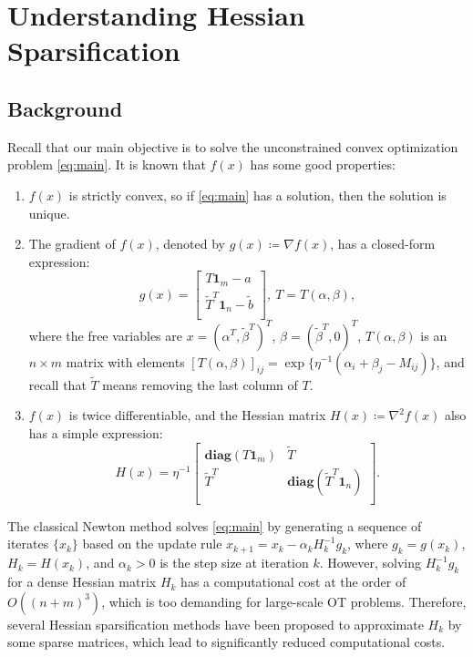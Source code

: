 \documentclass{article}
\theoremstyle{plain}
\theoremstyle{definition}
\theoremstyle{remark}
\begin{document}
\section{Understanding Hessian Sparsification}
\label{sec:understanding}

\subsection{Background}
Recall that our main objective is to solve the unconstrained convex optimization problem \eqref{eq:main}. It is known that $f(x)$ has some good properties:
\begin{enumerate}
    \item $f(x)$ is strictly convex, so if \eqref{eq:main} has a solution, then the solution is unique.
    \item The gradient of $f(x)$, denoted by $g(x)\coloneqq\nabla f(x)$, has a closed-form expression:
    \begin{equation*}
    \label{eq:gradient}
        g(x) = \begin{bmatrix}
            T \mathbf{1}_m - a \\
            \tilde{T}^T \mathbf{1}_n - \tilde{b} \\
        \end{bmatrix},\ 
        T = T(\alpha, \beta),
    \end{equation*}
    where the free variables are $x=(\alpha^T,\tilde{\beta}^T)^T$, $\beta=(\tilde{\beta}^T,0)^T$, $T(\alpha,\beta)$ is an $n\times m$ matrix with elements $[ T(\alpha, \beta) ]_{ij} = \exp\{ \eta^{-1}(\alpha_i + \beta_j - M_{ij}) \}$, and recall that $\tilde{T}$ means removing the last column of $T$.
    \item $f(x)$ is twice differentiable, and the Hessian matrix $H(x)\coloneqq\nabla^2 f(x)$ also has a simple expression:
    \begin{equation}
    \label{eq:Hessian}
        H(x) = \eta^{-1}\begin{bmatrix}
                \mathbf{diag}(T \mathbf{1}_m) & \tilde{T} \\
                \tilde{T}^{T} & \mathbf{diag}(\tilde{T}^{T} \mathbf{1}_n) \\
            \end{bmatrix}.
    \end{equation}
\end{enumerate}

The classical Newton method solves \eqref{eq:main} by generating a sequence of iterates $\{x_k\}$ based on the update rule
$x_{k+1}=x_k-\alpha_k H_k^{-1}g_k$, where $g_k=g(x_k)$, $H_k=H(x_k)$, and $\alpha_k>0$ is the step size at iteration $k$.
However, solving $H_k^{-1}g_k$ for a dense Hessian matrix $H_k$ has a computational cost at the order of $O((n+m)^3)$, which is too demanding for large-scale OT problems. Therefore, several Hessian sparsification methods have been proposed to approximate $H_k$ by some sparse matrices, which lead to significantly reduced computational costs.
\end{document}
